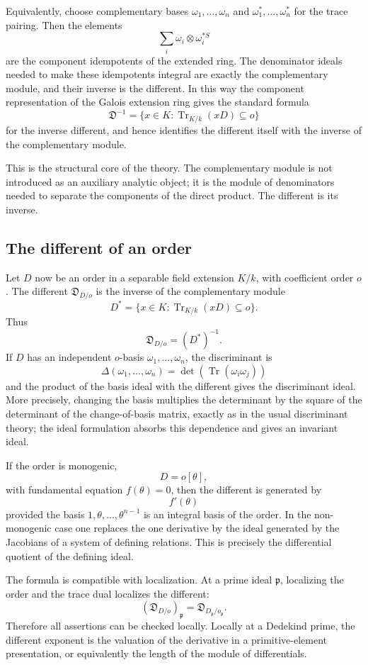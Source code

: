 \documentclass[12pt]{article}
\begin{document}
Equivalently, choose complementary bases \(\omega_1,
\ldots,
\omega_n\) and \(\omega_1^*,
\ldots,\omega_n^*\) for the trace pairing. Then the elements
\[
  \sum_i \omega_i\otimes \omega_i^{*S}
\]
are the component idempotents of the extended ring. The denominator ideals needed to make these idempotents integral are exactly the complementary module, and their inverse is the different. In this way the component representation of the Galois extension ring gives the standard formula
\[
  \mathfrak D^{-1}=\{x\in K: \operatorname{Tr}_{K/k}(xD)\subseteq o\}
\]
for the inverse different, and hence identifies the different itself with the inverse of the complementary module.

This is the structural core of the theory. The complementary module is not introduced as an auxiliary analytic object; it is the module of denominators needed to separate the components of the direct product. The different is its inverse.

\subsection{The different of an order}

Let \(D\) now be an order in a separable field extension \(K/k\), with coefficient order \(o\). The different \(\mathfrak D_{D/o}\) is the inverse of the complementary module
\[
  D^*=
  \{x\in K: \operatorname{Tr}_{K/k}(xD)\subseteq o\}.
\]
Thus
\[
  \mathfrak D_{D/o}=(D^*)^{-1}.
\]
If \(D\) has an independent \(o\)-basis \(\omega_1,
\ldots,
\omega_n\), the discriminant is
\[
  \Delta(\omega_1,
\ldots,
\omega_n)=
  \det(\operatorname{Tr}(\omega_i\omega_j))
\]
and the product of the basis ideal with the different gives the discriminant ideal. More precisely, changing the basis multiplies the determinant by the square of the determinant of the change-of-basis matrix, exactly as in the usual discriminant theory; the ideal formulation absorbs this dependence and gives an invariant ideal.

If the order is monogenic,
\[
  D=o[\theta],
\]
with fundamental equation \(f(\theta)=0\), then the different is generated by
\[
  f'(\theta)
\]
provided the basis \(1,\theta,
\ldots,
\theta^{n-1}\) is an integral basis of the order. In the non-monogenic case one replaces the one derivative by the ideal generated by the Jacobians of a system of defining relations. This is precisely the differential quotient of the defining ideal.

The formula is compatible with localization. At a prime ideal \(\mathfrak p\), localizing the order and the trace dual localizes the different:
\[
  (\mathfrak D_{D/o})_{\mathfrak p}
  =\mathfrak D_{D_{\mathfrak p}/o_{\mathfrak p}}.
\]
Therefore all assertions can be checked locally. Locally at a Dedekind prime, the different exponent is the valuation of the derivative in a primitive-element presentation, or equivalently the length of the module of differentials.
\end{document}
